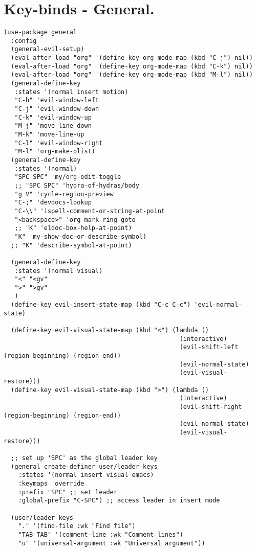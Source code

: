 \documentclass[11pt]{article}
\begin{document}
\section{Key-binds - General.}
\label{sec:org5478453}
\begin{verbatim}
(use-package general
  :config
  (general-evil-setup)
  (eval-after-load "org" '(define-key org-mode-map (kbd "C-j") nil))
  (eval-after-load "org" '(define-key org-mode-map (kbd "C-k") nil))
  (eval-after-load "org" '(define-key org-mode-map (kbd "M-l") nil))
  (general-define-key
   :states '(normal insert motion)
   "C-h" 'evil-window-left
   "C-j" 'evil-window-down
   "C-k" 'evil-window-up
   "M-j" 'move-line-down
   "M-k" 'move-line-up
   "C-l" 'evil-window-right
   "M-l" 'org-make-olist)
  (general-define-key
   :states '(normal)
   "SPC SPC" 'my/org-edit-toggle
   ;; "SPC SPC" 'hydra-of-hydras/body
   "g V" 'cycle-region-preview
   "C-;" 'devdocs-lookup
   "C-\\" 'ispell-comment-or-string-at-point
   "<backspace>" 'org-mark-ring-goto
   ;; "K" 'eldoc-box-help-at-point)
   "K" 'my-show-doc-or-describe-symbol)
  ;; "K" 'describe-symbol-at-point) 

  (general-define-key
   :states '(normal visual)
   "<" "<gv"
   ">" ">gv"
   )
  (define-key evil-insert-state-map (kbd "C-c C-c") 'evil-normal-state)

  (define-key evil-visual-state-map (kbd "<") (lambda ()
                                                (interactive)
                                                (evil-shift-left (region-beginning) (region-end))
                                                (evil-normal-state)
                                                (evil-visual-restore)))
  (define-key evil-visual-state-map (kbd ">") (lambda ()
                                                (interactive)
                                                (evil-shift-right (region-beginning) (region-end))
                                                (evil-normal-state)
                                                (evil-visual-restore)))

  ;; set up 'SPC' as the global leader key
  (general-create-definer user/leader-keys
    :states '(normal insert visual emacs)
    :keymaps 'override
    :prefix "SPC" ;; set leader
    :global-prefix "C-SPC") ;; access leader in insert mode

  (user/leader-keys
    "." '(find-file :wk "Find file")
    "TAB TAB" '(comment-line :wk "Comment lines")
    "u" '(universal-argument :wk "Universal argument"))


\end{verbatim}
\end{document}

